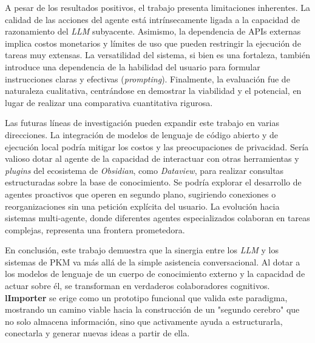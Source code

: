 A pesar de los resultados positivos, el trabajo presenta limitaciones inherentes. La calidad de las acciones del agente está intrínsecamente ligada a la capacidad de razonamiento del \textit{LLM} subyacente. Asimismo, la dependencia de APIs externas implica costos monetarios y límites de uso que pueden restringir la ejecución de tareas muy extensas. La versatilidad del sistema, si bien es una fortaleza, también introduce una dependencia de la habilidad del usuario para formular instrucciones claras y efectivas (\textit{prompting}). Finalmente, la evaluación fue de naturaleza cualitativa, centrándose en demostrar la viabilidad y el potencial, en lugar de realizar una comparativa cuantitativa rigurosa.

Las futuras líneas de investigación pueden expandir este trabajo en varias direcciones. La integración de modelos de lenguaje de código abierto y de ejecución local podría mitigar los costos y las preocupaciones de privacidad. Sería valioso dotar al agente de la capacidad de interactuar con otras herramientas y \textit{plugins} del ecosistema de \textit{Obsidian}, como \textit{Dataview}, para realizar consultas estructuradas sobre la base de conocimiento. Se podría explorar el desarrollo de agentes proactivos que operen en segundo plano, sugiriendo conexiones o reorganizaciones sin una petición explícita del usuario. La evolución hacia sistemas multi-agente, donde diferentes agentes especializados colaboran en tareas complejas, representa una frontera prometedora.

En conclusión, este trabajo demuestra que la sinergia entre los \textit{LLM} y los sistemas de PKM va más allá de la simple asistencia conversacional. Al dotar a los modelos de lenguaje de un cuerpo de conocimiento externo y la capacidad de actuar sobre él, se transforman en verdaderos colaboradores cognitivos. \textbf{lImporter} se erige como un prototipo funcional que valida este paradigma, mostrando un camino viable hacia la construcción de un "segundo cerebro" que no solo almacena información, sino que activamente ayuda a estructurarla, conectarla y generar nuevas ideas a partir de ella.